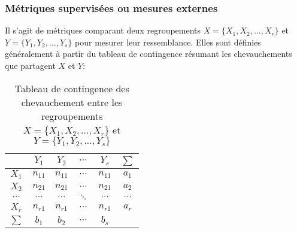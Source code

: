 \subsubsection{Métriques supervisées ou mesures externes}
\label{sec:similarite:biblio:supeval}
Il s'agit de métriques comparant deux regroupements $X = \lbrace X_1, X_2, ..., X_r \rbrace$ et $Y = \lbrace Y_1, Y_2, ..., Y_s \rbrace$ pour mesurer leur ressemblance. Elles sont définies généralement à partir du tableau de contingence résumant les chevauchements que partagent $X$ et $Y$:
\begin{table}[]
	\centering
	\begin{tabular}{|c|c|c|c|c|c|}
		\hline
		& $Y_1$    & $Y_2$    & $\cdots$ & $Y_s$    & $\sum$   \\ \hline
		$X_1$    & $n_{11}$ & $n_{11}$ & $\cdots$ & $n_{11}$ & $a_1$    \\ \hline
		$X_2$    & $n_{21}$ & $n_{21}$ & $\cdots$ & $n_{21}$ & $a_2$    \\ \hline
		$\cdots$ & $\cdots$ & $\cdots$ & $\ddots$ & $\cdots$ & $\cdots$ \\ \hline
		$X_r$    & $n_{r1}$ & $n_{r1}$ & $\cdots$ & $n_{r1}$ & $a_r$    \\ \hline
		$\sum$   & $b_1$    & $b_2$    & $\cdots$ & $b_s$    &          \\ \hline
	\end{tabular}
	\caption{Tableau de contingence des chevauchement entre les regroupements $X = \lbrace X_1, X_2, ..., X_r \rbrace$ et $Y = \lbrace Y_1, Y_2, ..., Y_s \rbrace$}
\end{table}

